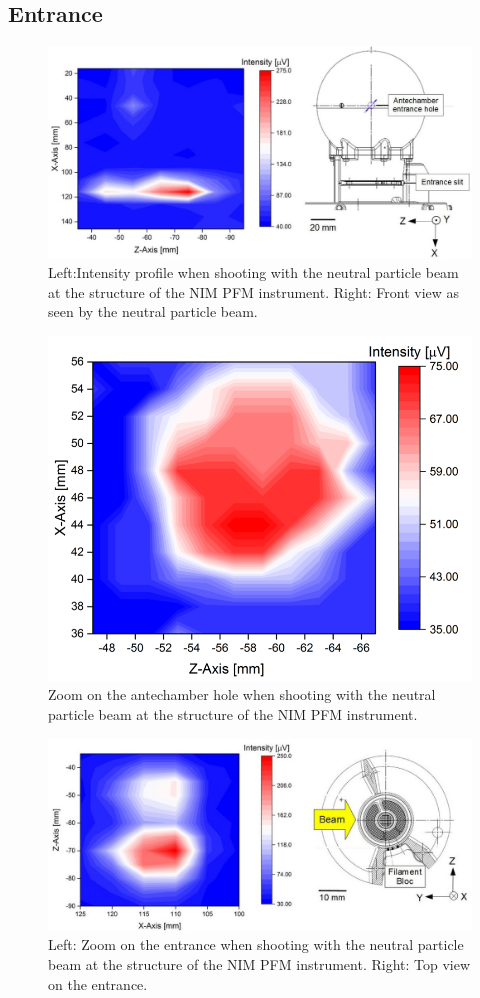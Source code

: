 	\subsection{Entrance }
	\begin{figure}[h!]
		\centering
		\includegraphics[width=\textwidth]{Experiments/2D_scan_anteEntr.jpg}
		\caption{Left:Intensity profile when shooting with the neutral particle beam at the structure of the NIM PFM instrument. Right: Front view as seen by the neutral particle beam.}
		\label{exp:PFMIntCharTot}
	\end{figure}
	\begin{figure}[h!]
		\centering
		\includegraphics[width=.7\textwidth]{Experiments/2D_scan_Ant.png}
		\caption{Zoom on the antechamber hole when shooting with the neutral particle beam at the structure of the NIM PFM instrument.}
		\label{exp:PFMIntCharAnt}
	\end{figure}	
	\begin{figure}[h!]
		\centering
		\includegraphics[width=\textwidth]{Experiments/2D_scan_Entr.jpg}
		\caption{Left: Zoom on the entrance when shooting with the neutral particle beam at the structure of the NIM PFM instrument. Right: Top view on the entrance.}
		\label{exp:PFMIntCharEnt}
	\end{figure}
